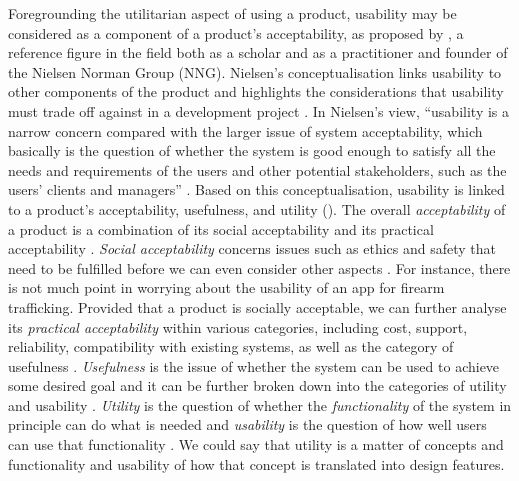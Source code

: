 Foregrounding the utilitarian aspect of using a product, usability may be considered as a  component of a product’s acceptability, as proposed by \citet{nielsen2010}, a reference figure in the field both as a scholar and as a practitioner and founder of the Nielsen Norman Group (NNG). Nielsen's conceptualisation links usability to other components of the product and highlights the considerations that usability must trade off against in a development project  \citep{nielsen2010}.  In Nielsen’s view, ``usability is a narrow concern compared with the larger issue of system acceptability, which basically is the question of whether the system is good enough to satisfy all the needs and requirements of the users and other potential stakeholders, such as the users’ clients and managers''  \citep[4]{nielsen2010}. Based on this conceptualisation, usability is linked to a product’s acceptability, usefulness, and utility (). The overall \textit{acceptability} of a product is a combination of its social acceptability and its practical acceptability \citep{nielsen2010}. \textit{Social acceptability} concerns issues such as ethics and safety that need to be fulfilled before we can even consider other aspects \citep{nielsen2010}. For instance, there is not much point in worrying about the usability of an app for firearm trafficking. Provided that a product is socially acceptable, we can further analyse its \textit{practical acceptability} within various categories, including cost, support, reliability, compatibility with existing systems, as well as the category of usefulness  \citep{nielsen2010}. \textit{Usefulness} is the issue of whether the system can be used to achieve some desired goal and it can be further broken down into the categories of utility and usability \citep{nielsen2010}. \textit{Utility} is the question of whether the \textit{functionality} of the system in principle can do what is needed and \textit{usability} is the question of how well users can use that functionality \citep{nielsen2010}. We could say that utility is a matter of concepts and functionality and usability of how that concept is translated into design features.

